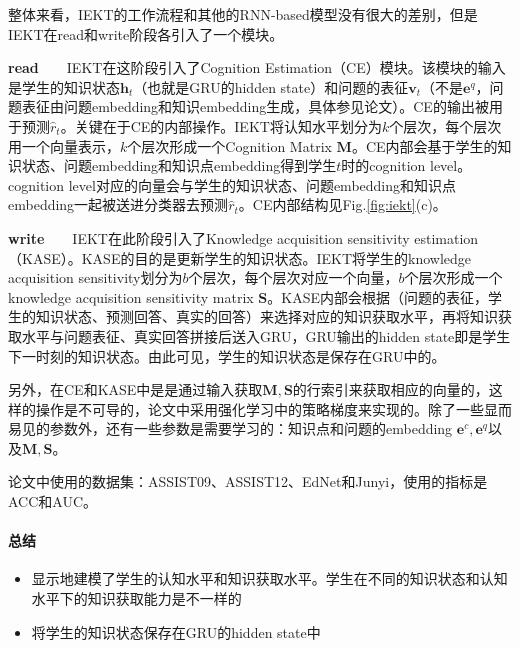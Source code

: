 整体来看，IEKT的工作流程和其他的RNN-based模型没有很大的差别，但是IEKT在read和write阶段各引入了一个模块。

\par{\textbf{read}}\ \ \ \ IEKT在这阶段引入了Cognition Estimation（CE）模块。该模块的输入是学生的知识状态$\boldsymbol{h}_t$（也就是GRU的hidden state）和问题的表征$\boldsymbol{v}_t$（不是$\boldsymbol{e}^q$，问题表征由问题embedding和知识embedding生成，具体参见论文）。CE的输出被用于预测$\hat{r}_t$。关键在于CE的内部操作。IEKT将认知水平划分为$k$个层次，每个层次用一个向量表示，$k$个层次形成一个Cognition Matrix $\boldsymbol{M}$。CE内部会基于学生的知识状态、问题embedding和知识点embedding得到学生$t$时的cognition level。cognition level对应的向量会与学生的知识状态、问题embedding和知识点embedding一起被送进分类器去预测$\hat{r}_t$。CE内部结构见Fig.\ref{fig:iekt}(c)。

\par{\textbf{write}}\ \ \ \ IEKT在此阶段引入了Knowledge acquisition sensitivity estimation（KASE）。KASE的目的是更新学生的知识状态。IEKT将学生的knowledge acquisition sensitivity划分为$b$个层次，每个层次对应一个向量，$b$个层次形成一个knowledge acquisition sensitivity matrix $\boldsymbol{S}$。KASE内部会根据（问题的表征，学生的知识状态、预测回答、真实的回答）来选择对应的知识获取水平，再将知识获取水平与问题表征、真实回答拼接后送入GRU，GRU输出的hidden state即是学生下一时刻的知识状态。由此可见，学生的知识状态是保存在GRU中的。

另外，在CE和KASE中是是通过输入获取$\boldsymbol{M}, \boldsymbol{S}$的行索引来获取相应的向量的，这样的操作是不可导的，论文中采用强化学习中的策略梯度来实现的。除了一些显而易见的参数外，还有一些参数是需要学习的：知识点和问题的embedding $\boldsymbol{e}^c, \boldsymbol{e}^q$以及$\boldsymbol{M}, \boldsymbol{S}$。

论文中使用的数据集：ASSIST09、ASSIST12、EdNet和Junyi，使用的指标是ACC和AUC。

\paragraph{总结}

\begin{itemize}
	\item 显示地建模了学生的认知水平和知识获取水平。学生在不同的知识状态和认知水平下的知识获取能力是不一样的
	\item 将学生的知识状态保存在GRU的hidden state中
	
\end{itemize}


